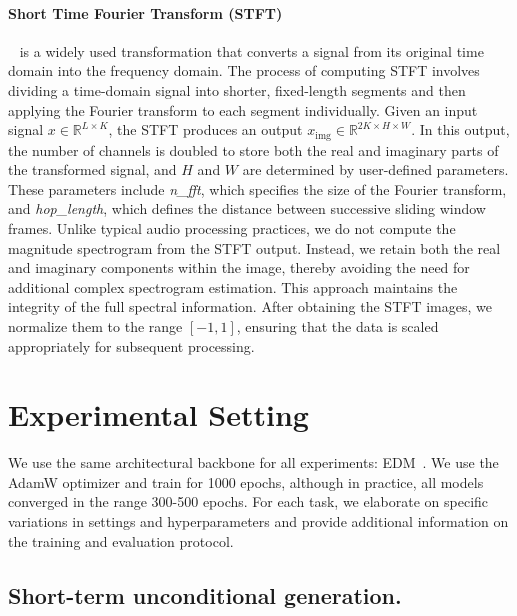 \documentclass{article}
\begin{document}
\paragraph{Short Time Fourier Transform (STFT)}~\cite{griffin1984signal} is a widely used transformation that converts a signal from its original time domain into the frequency domain. The process of computing STFT involves dividing a time-domain signal into shorter, fixed-length segments and then applying the Fourier transform to each segment individually. Given an input signal \( x \in \mathbb{R}^{L \times K} \), the STFT produces an output \( x_{\text{img}} \in \mathbb{R}^{2K \times H \times W} \). In this output, the number of channels is doubled to store both the real and imaginary parts of the transformed signal, and \( H \) and \( W \) are determined by user-defined parameters. These parameters include \textit{n\_fft}, which specifies the size of the Fourier transform, and \textit{hop\_length}, which defines the distance between successive sliding window frames. Unlike typical audio processing practices, we do not compute the magnitude spectrogram from the STFT output. Instead, we retain both the real and imaginary components within the image, thereby avoiding the need for additional complex spectrogram estimation. This approach maintains the integrity of the full spectral information. After obtaining the STFT images, we normalize them to the range \([-1,1]\), ensuring that the data is scaled appropriately for subsequent processing.


\section{Experimental Setting }
\label{app:experimental_setting}

We use the same architectural backbone for all experiments: EDM~\cite{karras2022elucidating}. We use the AdamW optimizer and train for 1000 epochs, although in practice, all models converged in the range 300-500 epochs. For each task, we elaborate on specific variations in settings and hyperparameters and provide additional information on the training and evaluation protocol.


\subsection{Short-term unconditional generation.} 
\end{document}
